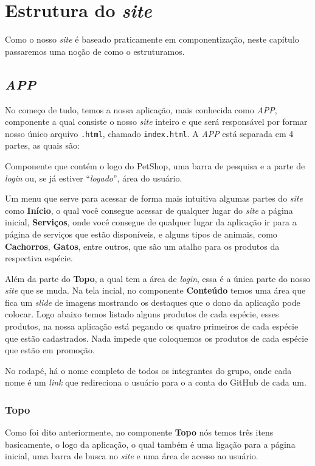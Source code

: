 \chapter{Estrutura do \emph{site}}
Como o nosso \emph{site} é baseado praticamente em componentização, neste
capítulo passaremos uma noção de como o estruturamos.

\section{\emph{APP}}
No começo de tudo, temos a nossa aplicação, mais conhecida como \emph{APP},
componente a qual consiste o nosso \emph{site} inteiro e que será responsável
por formar nosso único arquivo \texttt{.html}, chamado \texttt{index.html}. A
\emph{APP} está separada em 4 partes, as quais são:
	\begin{description}[style=nextline]
		\item[Topo] Componente que contém o logo do PetShop, uma barra de
pesquisa e a parte de \emph{login} ou, se já estiver “\emph{logado}”, área do
usuário.
		\item[\emph{Navbar}] Um menu que serve para acessar de forma mais
intuitiva algumas partes do \emph{site} como \textbf{Início}, o qual você
consegue acessar de qualquer lugar do \emph{site} a página inicial,
\textbf{Serviços}, onde você consegue de qualquer lugar da aplicação ir para a
página de serviços que estão disponíveis, e alguns tipos de animais, como
\textbf{Cachorros}, \textbf{Gatos}, entre outros, que são um atalho para os
produtos da respectiva espécie.
		\item[Conteúdo] Além da parte do \textbf{Topo}, a qual tem a área de
\emph{login}, essa é a única parte do nosso \emph{site} que se muda. Na tela
incial, no componente \textbf{Conteúdo} temos uma área que fica um \emph{slide}
de imagens mostrando os destaques que o dono da aplicação pode colocar. Logo
abaixo temos listado alguns produtos de cada espécie, esses produtos, na nossa
aplicação está pegando os quatro primeiros de cada espécie que estão
cadastrados. Nada impede que coloquemos os produtos de cada espécie que estão em
promoção.
		\item[Rodapé] No rodapé, há o nome completo de todos os integrantes do
grupo, onde cada nome é um \emph{link} que redireciona o usuário para o a conta
do GitHub de cada um.
	\end{description}

\subsection{Topo}
Como foi dito anteriormente, no componente \textbf{Topo} nós temos três itens
basicamente, o logo da aplicação, o qual também é uma ligação para a página
inicial, uma barra de busca no \emph{site} e uma área de acesso ao usuário.

